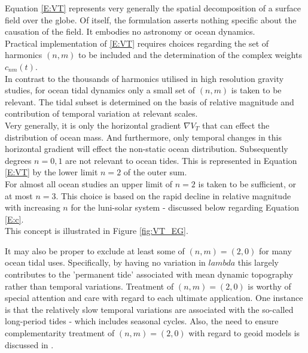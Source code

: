 Equation \ref{E:VT} represents very generally the spatial decomposition of a surface field over the globe.  Of itself, the formulation asserts nothing specific about the causation of the field.  It embodies no astronomy or ocean dynamics.\\
Practical implementation of \ref{E:VT} requires choices regarding the set of harmonics $(n,m)$ to be included and the determination of the complex weights $c_{nm}(t)$.\\
In contrast to the thousands of harmonics utilised in high resolution gravity studies, for ocean tidal dynamics only a small set of $(n,m)$ is taken to be relevant.   The tidal subset is determined on the basis of relative magnitude and contribution of temporal variation at relevant scales.\\
Very generally, it is only the horizontal gradient $\nabla V_T$ that can effect the distribution of ocean mass.  And furthermore, only temporal changes in this horizontal gradient will effect the non-static ocean distribution. Subsequently degrees $n=0,1$ are not relevant to ocean tides.   This is represented in Equation \ref{E:VT} by the lower limit $n=2$ of the outer sum.\\
For almost all ocean studies an upper limit of $n=2$ is taken to be sufficient, or at most $n=3$.  This choice is based on the rapid decline in relative magnitude with increasing $n$ for the luni-solar system - discussed below regarding Equation \ref{E:c}.\\
This concept is illustrated in Figure \ref{fig:VT_EG}.


It may also be proper to exclude at least some of $(n,m) = (2,0)$ for many ocean tidal uses.  Specifically, by having no variation in $lambda$ this largely contributes to the 'permanent tide' associated with mean dynamic topography rather than temporal variations.  Treatment of $(n,m) = (2,0)$ is worthy of special attention and care with regard to each ultimate application.  One instance is that the relatively slow temporal variations are associated with the so-called long-period tides - which includes seasonal cycles.  Also, the need to ensure complementarity treatment of $(n,m) = (2,0)$ with regard to geoid models is discussed in \cite[section 5.3.3.2]{Urban:2013vl}.


